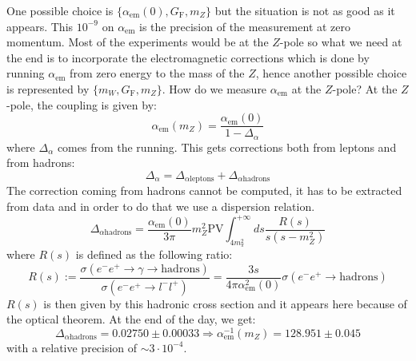 \documentclass[../main.tex]{subfiles}
\begin{document}
One possible choice is $\{\alpha_{\text{em}}(0), G_{\text{F}}, m_Z \}$ but the situation is not as good as it appears. This $10^{-9}$ on $\alpha_{\text{em}}$ is the precision of the measurement at zero momentum. Most of the experiments would be at the $Z$-pole so what we need at the end is to incorporate the electromagnetic corrections which is done by running $\alpha_{\text{em}}$ from zero energy to the mass of the $Z$, hence another possible choice is represented by $\{m_W, G_{\text{F}}, m_Z\}$. How do we measure $\alpha_{\text{em}}$ at the $Z$-pole? At the $Z$-pole, the coupling is given by:
\[
\alpha_{\text{em}}(m_Z)=\frac{\alpha_{\text{em}}(0)}{1-\Delta_\alpha}
\]
where $\Delta_\alpha$ comes from the running. This gets corrections both from leptons and from hadrons:
\[
\Delta_\alpha=\Delta_{\alpha\text{leptons}}+\Delta_{\alpha\text{hadrons}}
\]
The correction coming from hadrons cannot be computed, it has to be extracted from data and in order to do that we use a dispersion relation.
\[
\Delta_{\alpha\text{hadrons}}=\frac{\alpha_{\text{em}}(0)}{3\pi}m_Z^2\text{PV}\int_{4m_\pi^2}^{+\infty}ds\frac{R(s)}{s(s-m_Z^2)}
\]
where $R(s)$ is defined as the following ratio:
\[
R(s):=\frac{\sigma(e^-e^+\to\gamma\to\text{hadrons})}{\sigma(e^-e^+\to l^-l^+)}=\frac{3s}{4\pi\alpha^2_{\text{em}}(0)}\sigma(e^-e^+\to\text{hadrons})
\]
$R(s)$ is then given by this hadronic cross section and it appears here because of the optical theorem. At the end of the day, we get:
\[
\Delta_{\alpha\text{hadrons}}=0.02750\pm0.00033\Rightarrow\alpha_{\text{em}}^{-1}(m_Z)=128.951\pm0.045
\]
with a relative precision of $\sim3\cdot10^{-4}$.
\end{document}
